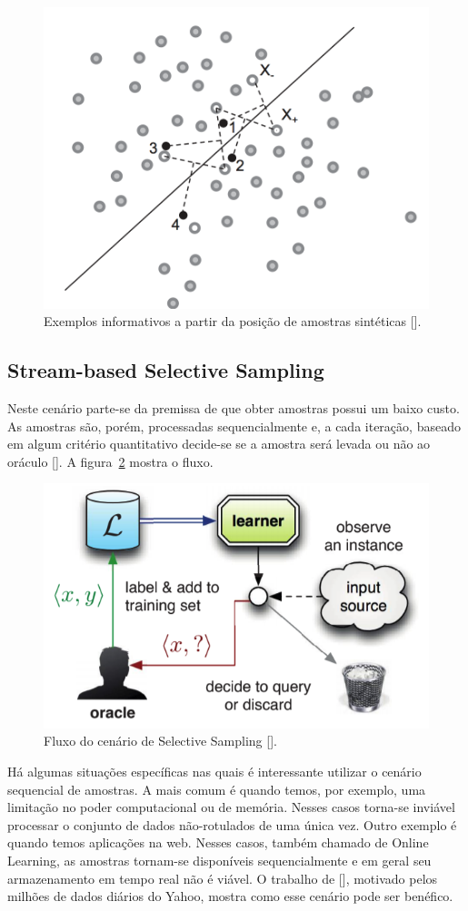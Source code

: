 \begin{figure}
  \centering
  \includegraphics[width=.5\textwidth]{figures/wang_2015_membership.png}
  \caption{Exemplos informativos a partir da posição de amostras sintéticas [\cite{wang2015active}].}
  \label{fig:wang_2015_membership}
\end{figure}


\subsection{Stream-based Selective Sampling}
\label{sec:cenarios_selective_sampling}

Neste cenário parte-se da premissa de que obter amostras possui um baixo custo. As amostras são, porém, processadas sequencialmente e, a cada iteração, baseado em algum critério quantitativo decide-se se a amostra será levada ou não ao oráculo [\cite{settles2014active}]. A figura~\ref{fig:settles_2014_selective_sampling} mostra o fluxo. 

\begin{figure}
  \centering
  \includegraphics[width=.5\textwidth]{figures/settles_2014_selective_sampling.png}
  \caption{Fluxo do cenário de Selective Sampling [\cite{settles2014active}].}
  \label{fig:settles_2014_selective_sampling}
\end{figure}


Há algumas situações específicas nas quais é interessante utilizar o cenário sequencial de amostras. A mais comum é quando temos, por exemplo, uma limitação no poder computacional ou de memória. Nesses casos torna-se inviável processar o conjunto de dados não-rotulados de uma única vez. Outro exemplo é quando temos aplicações na web. Nesses casos, também chamado de Online Learning, as amostras tornam-se disponíveis sequencialmente e em geral seu armazenamento em tempo real não é viável. O trabalho de [\cite{chu2011unbiased}], motivado pelos milhões de dados diários do Yahoo, mostra como esse cenário pode ser benéfico. 




